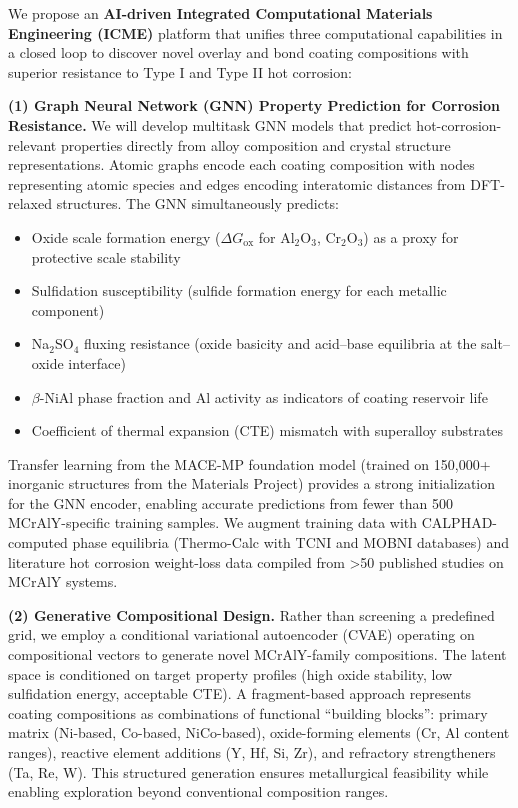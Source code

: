 \documentclass[11pt,letterpaper]{article}
\begin{document}
We propose an \textbf{AI-driven Integrated Computational Materials Engineering (ICME)} platform that unifies three computational capabilities in a closed loop to discover novel overlay and bond coating compositions with superior resistance to Type I and Type II hot corrosion:

\textbf{(1) Graph Neural Network (GNN) Property Prediction for Corrosion Resistance.}
We will develop multitask GNN models that predict hot-corrosion-relevant properties directly from alloy composition and crystal structure representations. Atomic graphs encode each coating composition with nodes representing atomic species and edges encoding interatomic distances from DFT-relaxed structures. The GNN simultaneously predicts:
\begin{itemize}[nosep]
  \item Oxide scale formation energy ($\Delta G_{\text{ox}}$ for Al$_2$O$_3$, Cr$_2$O$_3$) as a proxy for protective scale stability
  \item Sulfidation susceptibility (sulfide formation energy for each metallic component)
  \item Na$_2$SO$_4$ fluxing resistance (oxide basicity and acid--base equilibria at the salt--oxide interface)
  \item $\beta$-NiAl phase fraction and Al activity as indicators of coating reservoir life
  \item Coefficient of thermal expansion (CTE) mismatch with superalloy substrates
\end{itemize}

Transfer learning from the MACE-MP foundation model (trained on 150,000+ inorganic structures from the Materials Project) provides a strong initialization for the GNN encoder, enabling accurate predictions from fewer than 500 MCrAlY-specific training samples. We augment training data with CALPHAD-computed phase equilibria (Thermo-Calc with TCNI and MOBNI databases) and literature hot corrosion weight-loss data compiled from \textgreater50 published studies on MCrAlY systems.

\textbf{(2) Generative Compositional Design.}
Rather than screening a predefined grid, we employ a conditional variational autoencoder (CVAE) operating on compositional vectors to generate novel MCrAlY-family compositions. The latent space is conditioned on target property profiles (high oxide stability, low sulfidation energy, acceptable CTE). A fragment-based approach represents coating compositions as combinations of functional ``building blocks'': primary matrix (Ni-based, Co-based, NiCo-based), oxide-forming elements (Cr, Al content ranges), reactive element additions (Y, Hf, Si, Zr), and refractory strengtheners (Ta, Re, W). This structured generation ensures metallurgical feasibility while enabling exploration beyond conventional composition ranges.
\end{document}
